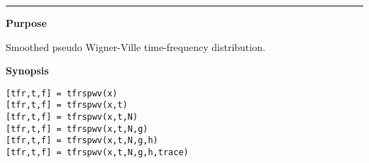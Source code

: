 

\hspace*{-1.6cm}{\Large \bf tfrspwv}

\vspace*{-.4cm}
\hspace*{-1.6cm}\rule[0in]{16.5cm}{.02cm}
\vspace*{.2cm}

{\bf \large {}\selectfont Purpose}\\
\hspace*{1.5cm}
\begin{minipage}[t]{13.5cm}
Smoothed pseudo Wigner-Ville time-frequency distribution.
\end{minipage}
\vspace*{.5cm}

{\bf \large {}\selectfont Synopsis}\\
\hspace*{1.5cm}
\begin{minipage}[t]{13.5cm}
\begin{verbatim}
[tfr,t,f] = tfrspwv(x)
[tfr,t,f] = tfrspwv(x,t)
[tfr,t,f] = tfrspwv(x,t,N)
[tfr,t,f] = tfrspwv(x,t,N,g)
[tfr,t,f] = tfrspwv(x,t,N,g,h)
[tfr,t,f] = tfrspwv(x,t,N,g,h,trace)
\end{verbatim}
\end{minipage}
\vspace*{.5cm}

